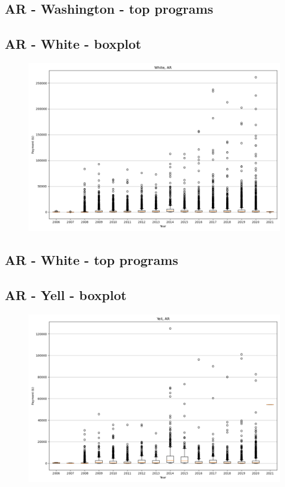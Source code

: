 \subsection*{AR - Washington - top programs}

\newpage
\subsection*{AR - White - boxplot}
\begin{figure}[h]
\centering
\includegraphics[width=7in]{../output/boxplots/counties/White-AR_boxplot.png}
\end{figure}


\subsection*{AR - White - top programs}

\newpage
\subsection*{AR - Yell - boxplot}
\begin{figure}[h]
\centering
\includegraphics[width=7in]{../output/boxplots/counties/Yell-AR_boxplot.png}
\end{figure}


